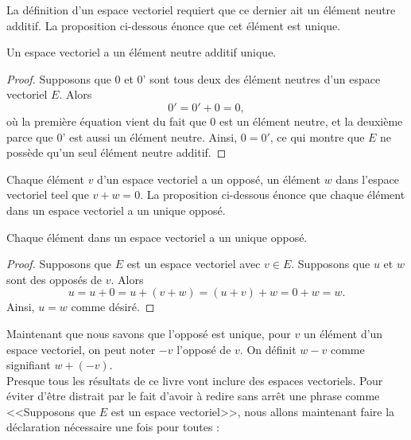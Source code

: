 \documentclass[12pt]{book}
\theoremstyle{plain}
\begin{document}
La définition d'un espace vectoriel requiert que ce dernier ait un élément neutre additif. La proposition ci-dessous énonce que cet élément est unique.\\

\begin{prop}
    Un espace vectoriel a un élément neutre additif unique.
    \begin{proof}
        Supposons que 0 et 0' sont tous deux des élément neutres d'un espace vectoriel $E$. Alors 
        \begin{equation*}
            0'=0'+0=0,
        \end{equation*}
        où la première équation vient du fait que 0 est un élément neutre, et la deuxième parce que 0' est aussi un élément neutre. Ainsi, $0=0'$, ce qui montre que $E$ ne possède qu'un seul élément neutre additif.
    \end{proof}
\end{prop}

Chaque élément $v$ d'un espace vectoriel a un opposé, un élément $w$ dans l'espace vectoriel teel que $v+w=0$. La proposition ci-dessous énonce que chaque élément dans un espace vectoriel a un unique opposé.\\

\begin{prop}
    Chaque élément dans un espace vectoriel a un unique opposé.
    \begin{proof}
        Supposons que $E$ est un espace vectoriel avec $v\in E$. Supposons que $u$ et $w$ sont des opposés de $v$. Alors
        \begin{equation*}
            u=u+0=u+(v+w)=(u+v)+w=0+w=w.
        \end{equation*}
        Ainsi, $u=w$ comme désiré.
    \end{proof}
\end{prop}

Maintenant que nous savons que l'opposé est unique, pour $v$ un élément d'un espace vectoriel, on peut noter $-v$ l'opposé de $v$. On définit $w-v$ comme signifiant $w+(-v)$.\\
\indent
Presque tous les résultats de ce livre vont inclure des espaces vectoriels. Pour éviter d'être distrait par le fait d'avoir à redire sans arrêt une phrase comme <<Supposons que $E$ est un espace vectoriel>>, nous allons maintenant faire la déclaration nécessaire une fois pour toutes :
\end{document}
